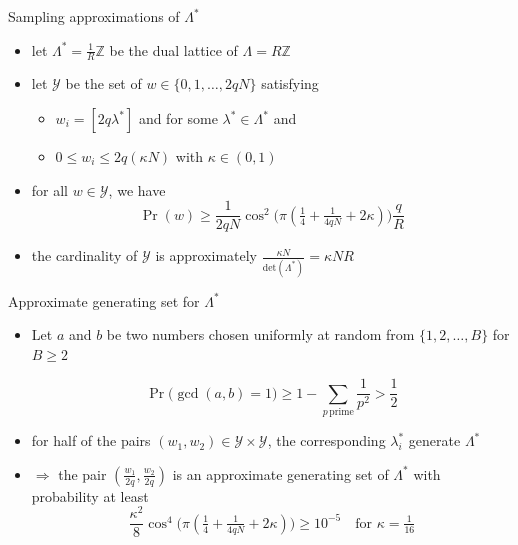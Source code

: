 \documentclass[slideColor]{prosper}
\renewcommand{\>}{\rangle}
\newcommand{\<}{\langle}
\begin{document}

\begin{slide}{Sampling approximations of $\Lambda^*$}

\begin{itemize}
\item let $\Lambda^* = \tfrac{1}{R} \mathbb Z$ be the dual lattice of $\Lambda= R \mathbb{Z}$

\medskip
\item let $\mathcal{Y}$ be the set of $w\in\{0,1,\ldots,2qN\}$ satisfying

\medskip
\begin{itemize}
\item $w_i = [2q \lambda^*]$ and for some $\lambda^*\in\Lambda^*$ and 

\medskip
\item $0\le w_i \le 2q (\kappa N)$ with $\kappa\in (0,1)$
\end{itemize}

\medskip
\item for all $w\in\mathcal{Y}$, we have
\[
\Pr(w) \ge \frac{1}{2qN} \cos^2\big( \pi (\tfrac{1}{4} + \tfrac{1}{4qN} + 2\kappa) \big) \frac{q}{R}
\]

\medskip
\item the cardinality of $\mathcal{Y}$ is approximately $\tfrac{\kappa N}{\mathrm{det}(\Lambda^*)} = \kappa N R$

\end{itemize}

\end{slide}


\begin{slide}{Approximate generating set for $\Lambda^*$}
\begin{itemize}
\item Let $a$ and $b$ be two numbers chosen uniformly at random from $\{1,2,\ldots,B\}$ for $B\ge 2$

\[
\Pr\big( \gcd(a,b) = 1 \big) \ge 1 - \sum_{p \, \mathrm{prime}} \frac{1}{p^2} > \frac{1}{2}
\]

\medskip
\item for half of the pairs $(w_1,w_2)\in\mathcal{Y}\times\mathcal{Y}$, the corresponding $\lambda_i^*$ generate $\Lambda^*$

\medskip
\item $\Rightarrow$ the pair $(\tfrac{w_1}{2q},\tfrac{w_2}{2q})$ is an approximate generating set of $\Lambda^*$ with probability at least
\[
\frac{\kappa^2}{8} \cos^4\big( \pi (\tfrac{1}{4} + \tfrac{1}{4qN} + 2\kappa) \big) \ge 10^{-5} \quad \mbox{for } \kappa=\tfrac{1}{16}
\]
\end{itemize}

\end{slide}
\end{document}
